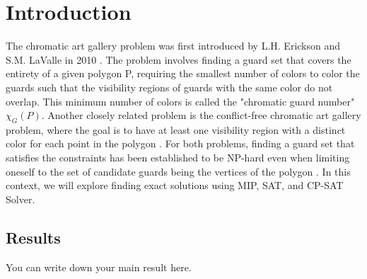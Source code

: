 \chapter{Introduction}
The chromatic art gallery problem was first introduced by L.H. Erickson and S.M. LaValle in 2010 \cite{erickson2010chromatic}. The problem involves finding a guard set that covers the entirety of a given polygon P, requiring the smallest number of colors to color the guards such that the visibility regions of guards with the same color do not overlap. This minimum number of colors is called the "chromatic guard number" $\chi_G(P)$. Another closely related problem is the conflict-free chromatic art gallery problem, where the goal is to have at least one visibility region with a distinct color for each point in the polygon \cite{bartschi2014conflict}. For both problems, finding a guard set that satisfies the constraints has been established to be NP-hard even when limiting oneself to the set of candidate guards being the vertices of the polygon \cite{fekete2014chromatic}\cite{erickson2011many}\cite{iwamoto2022vertex}. In this context, we will explore finding exact solutions using MIP, SAT, and CP-SAT Solver.

\section{Results}
You can write down your main result here.

